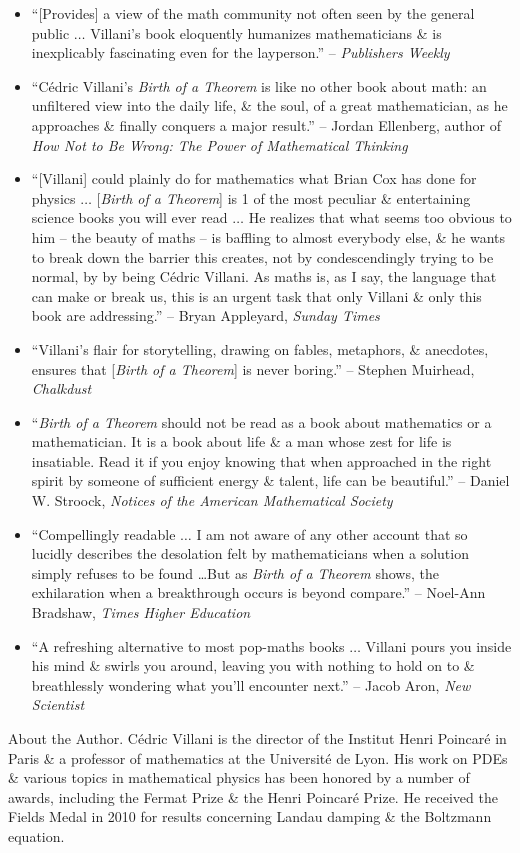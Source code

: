 \documentclass{article}
\begin{document}
\begin{enumerate}
\begin{itemize}
		\item ``[Provides] a view of the math community not often seen by the general public $\ldots$ {\sc Villani}'s book eloquently humanizes mathematicians \& is inexplicably fascinating even for the layperson.'' -- {\it Publishers Weekly}
		\item ``{\sc C\'edric Villani}'s {\it Birth of a Theorem} is like no other book about math: an unfiltered view into the daily life, \& the soul, of a great mathematician, as he approaches \& finally conquers a major result.'' -- {\sc Jordan Ellenberg}, author of {\it How Not to Be Wrong: The Power of Mathematical Thinking}
		\item ``[{\sc Villani}] could plainly do for mathematics what {\sc Brian Cox} has done for physics $\ldots$ [{\it Birth of a Theorem}] is 1 of the most peculiar \& entertaining science books you will ever read $\ldots$ He realizes that what seems too obvious to him -- the beauty of maths -- is baffling to almost everybody else, \& he wants to break down the barrier this creates, not by condescendingly trying to be normal, by by being {\sc C\'edric Villani}. As maths is, as I say, the language that can make or break us, this is an urgent task that only {\sc Villani} \& only this book are addressing.'' -- {\sc Bryan Appleyard}, {\it Sunday Times}
		\item ``{\sc Villani}'s flair for storytelling, drawing on fables, metaphors, \& anecdotes, ensures that [{\it Birth of a Theorem}] is never boring.'' -- {\sc Stephen Muirhead}, {\it Chalkdust}
		\item ``{\it Birth of a Theorem} should not be read as a book about mathematics or a mathematician. It is a book about life \& a man whose zest for life is insatiable. Read it if you enjoy knowing that when approached in the right spirit by someone of sufficient energy \& talent, life can be beautiful.'' -- {\sc Daniel W. Stroock}, {\it Notices of the American Mathematical Society}
		\item ``Compellingly readable $\ldots$ I am not aware of any other account that so lucidly describes the desolation felt by mathematicians when a solution simply refuses to be found \ldots But as {\it Birth of a Theorem} shows, the exhilaration when a breakthrough occurs is beyond compare.'' -- {\sc Noel-Ann Bradshaw}, {\it Times Higher Education}
		\item ``A refreshing alternative to most pop-maths books $\ldots$ {\sc Villani} pours you inside his mind \& swirls you around, leaving you with nothing to hold on to \& breathlessly wondering what you'll encounter next.'' -- {\sc Jacob Aron}, {\it New Scientist}
	\end{itemize}
	{\sf About the Author.} {\sc C\'edric Villani} is the director of the Institut Henri Poincaré in Paris \& a professor of mathematics at the Université de Lyon. His work on PDEs \& various topics in mathematical physics has been honored by a number of awards, including the Fermat Prize \& the Henri Poincar\'e Prize. He received the Fields Medal in 2010 for results concerning Landau damping \& the Boltzmann equation.
	

\end{enumerate}
\end{document}
